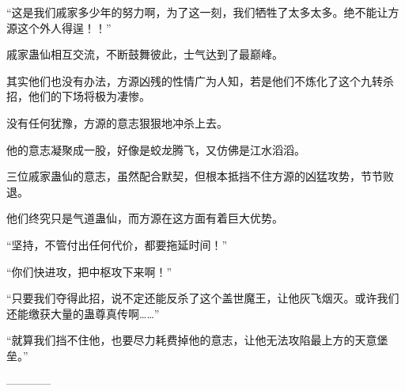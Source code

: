 \begin{this_body}
“这是我们戚家多少年的努力啊，为了这一刻，我们牺牲了太多太多。绝不能让方源这个外人得逞！！”

戚家蛊仙相互交流，不断鼓舞彼此，士气达到了最巅峰。

其实他们也没有办法，方源凶残的性情广为人知，若是他们不炼化了这个九转杀招，他们的下场将极为凄惨。

没有任何犹豫，方源的意志狠狠地冲杀上去。

他的意志凝聚成一股，好像是蛟龙腾飞，又仿佛是江水滔滔。

三位戚家蛊仙的意志，虽然配合默契，但根本抵挡不住方源的凶猛攻势，节节败退。

他们终究只是气道蛊仙，而方源在这方面有着巨大优势。

“坚持，不管付出任何代价，都要拖延时间！”

“你们快进攻，把中枢攻下来啊！”

“只要我们夺得此招，说不定还能反杀了这个盖世魔王，让他灰飞烟灭。或许我们还能缴获大量的蛊尊真传啊……”

“就算我们挡不住他，也要尽力耗费掉他的意志，让他无法攻陷最上方的天意堡垒。”

------------

\end{this_body}

